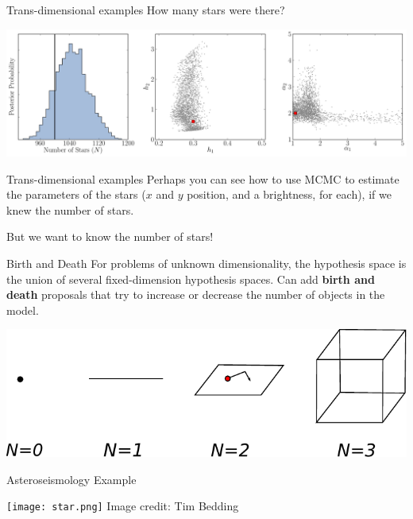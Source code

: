 \begin{frame}[t]{Trans-dimensional examples}
How many stars were there?
\begin{center}
\includegraphics[scale=0.25]{inference2.pdf}
\end{center}

\end{frame}

\begin{frame}[t]{Trans-dimensional examples}
Perhaps you can see how to use MCMC to estimate the parameters of the
stars ($x$ and $y$ position, and a brightness, for each), if we knew the
number of stars.

\vspace{20pt}
But we want to know the number of stars!
\end{frame}



\begin{frame}[t]{Birth and Death}
For problems of unknown dimensionality, the hypothesis space is the union
of several fixed-dimension hypothesis spaces. Can add {\bf birth and death}
proposals that try to increase or decrease the number of objects in the model.

\begin{center}
\includegraphics[scale=0.7]{drawing.pdf}
\end{center}

\end{frame}


\begin{frame}[t]{Asteroseismology Example}

\begin{center}
\texttt{[image: star.png]}
Image credit: Tim Bedding
\end{center}

\end{frame}

